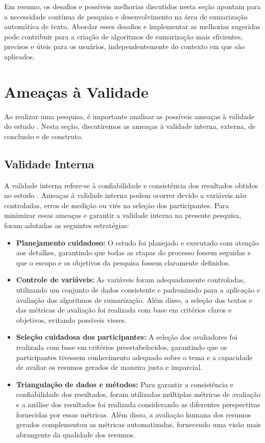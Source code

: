 Em resumo, os desafios e possíveis melhorias discutidos nesta seção apontam para 
a necessidade contínua de pesquisa e desenvolvimento na área de sumarização 
automática de texto. Abordar esses desafios e implementar as melhorias sugeridas 
pode contribuir para a criação de algoritmos de sumarização mais eficientes, 
precisos e úteis para os usuários, independentemente do contexto em que são 
aplicados.


\section{Ameaças à Validade}
\label{sec:ameacas-validade}
Ao realizar uma pesquisa, é importante analisar as possíveis ameaças à validade do estudo 
\cite{cook1979quasi}. Nesta seção, discutiremos as ameaças à validade interna, externa, de conclusão 
e de construto.

\subsection{Validade Interna}
A validade interna refere-se à confiabilidade e consistência dos resultados obtidos no estudo \cite{shadish2002experimental}. Ameaças à validade interna podem ocorrer devido a variáveis não controladas, erros de medição ou viés na seleção dos participantes. Para minimizar essas ameaças e garantir a validade interna na presente pesquisa, foram adotadas as seguintes estratégias:

\begin{itemize}
    \item \textbf{Planejamento cuidadoso:} O estudo foi planejado e executado com atenção aos detalhes, garantindo que todas as etapas do processo fossem seguidas e que o escopo e os objetivos da pesquisa fossem claramente definidos.
    \item \textbf{Controle de variáveis:} As variáveis foram adequadamente controladas, utilizando um conjunto de dados consistente e padronizado para a aplicação e avaliação dos algoritmos de sumarização. Além disso, a seleção dos textos e das métricas de avaliação foi realizada com base em critérios claros e objetivos, evitando possíveis vieses.
    \item \textbf{Seleção cuidadosa dos participantes:} A seleção dos avaliadores foi realizada com base em critérios preestabelecidos, garantindo que os participantes tivessem conhecimento adequado sobre o tema e a capacidade de avaliar os resumos gerados de maneira justa e imparcial.
    \item \textbf{Triangulação de dados e métodos:} Para garantir a consistência e confiabilidade dos resultados, foram utilizadas múltiplas métricas de avaliação e a análise dos resultados foi realizada considerando as diferentes perspectivas fornecidas por essas métricas. Além disso, a avaliação humana dos resumos gerados complementou as métricas automatizadas, fornecendo uma visão mais abrangente da qualidade dos resumos.
\end{itemize}

